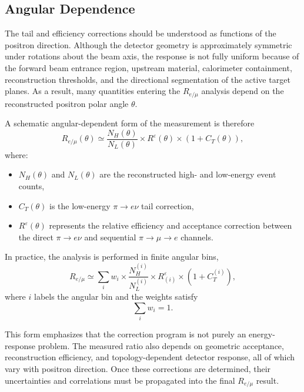 \subsection{Angular Dependence}
\label{subsec:remu-angular-dependence}

The tail and efficiency corrections should be understood as functions of the
positron direction. Although the detector geometry is approximately symmetric
under rotations about the beam axis, the response is not fully uniform because
of the forward beam entrance region, upstream material, calorimeter
containment, reconstruction thresholds, and the directional segmentation of
the active target planes. As a result, many quantities entering the
\(R_{e/\mu}\) analysis depend on the reconstructed positron polar angle
\(\theta\).

A schematic angular-dependent form of the measurement is therefore
\begin{equation}
  R_{e/\mu}(\theta)
  \simeq
  \frac{N_H(\theta)}
       {N_L(\theta)}
  \times
  R^\varepsilon(\theta)
  \times
  \left(
    1+C_T(\theta)
  \right),
  \label{eq:angular-remu}
\end{equation}
where:
\begin{itemize}
  \item \(N_H(\theta)\) and \(N_L(\theta)\) are the reconstructed high- and
  low-energy event counts,
  \item \(C_T(\theta)\) is the low-energy
  \(\pi\to e\nu\) tail correction,
  \item \(R^\varepsilon(\theta)\) represents the relative efficiency and
  acceptance correction between the direct
  \(\pi\to e\nu\) and sequential
  \(\pi\to\mu\to e\) channels.
\end{itemize}

In practice, the analysis is performed in finite angular bins,
\begin{equation}
  R_{e/\mu}
  \simeq
  \sum_i
  w_i
  \times
  \frac{N_H^{(i)}}
       {N_L^{(i)}}
  \times
  R^\varepsilon_{(i)}
  \times
  \left(
    1+C_T^{(i)}
  \right),
  \label{eq:angular-binned-remu}
\end{equation}
where \(i\) labels the angular bin and the weights satisfy
\begin{equation}
  \sum_i w_i = 1 .
\end{equation}

This form emphasizes that the correction program is not purely an
energy-response problem. The measured ratio also depends on geometric
acceptance, reconstruction efficiency, and topology-dependent detector
response, all of which vary with positron direction. Once these corrections
are determined, their uncertainties and correlations must be propagated into
the final \(R_{e/\mu}\) result.

